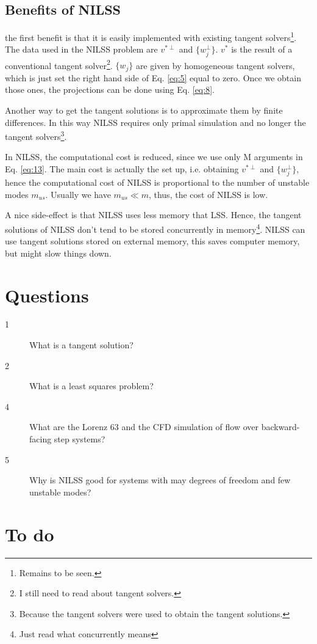 \documentclass[10pt,twoside,a4paper]{article} %
\begin{document}
\subsection{Benefits of NILSS}\label{3.5}
the first benefit is that it is easily implemented with existing tangent solvers\footnote{Remains to be seen.}. The data used in the NILSS problem are $v^{*\perp}$ and $\{ w_j^\perp \}$. $v^*$ is the result of a conventional tangent solver\footnote{I still need to read about tangent solvers.}. $\{ w_j \}$ are given by homogeneous tangent solvers, which is just set the right hand side of Eq. \ref{eq:5} equal to zero. Once we obtain those ones, the projections can be done using Eq. \ref{eq:8}.

Another way to get the tangent solutions is to approximate them by finite differences. In this way NILSS requires only primal simulation and no longer the tangent solvers\footnote{Because the tangent solvers were used to obtain the tangent solutions.}.

In NILSS, the computational cost is reduced, since we use only M arguments in Eq. \ref{eq:13}. The main cost is actually the set up, i.e. obtaining $v^{*\perp}$ and $\{ w_j^\perp \}$, hence the computational cost of NILSS is proportional to the number of unstable modes $m_{us}$. Usually we have $m_{us} \ll m$, thus, the cost of NILSS is low.

A nice side-effect is that NILSS uses less memory that LSS. Hence, the tangent solutions of NILSS don't tend to be stored concurrently in memory\footnote{Just read what concurrently means}. NILSS can use tangent solutions stored on external memory, this saves computer memory, but might slow things down.

\section{Questions}
\begin{description}
  \item [1] What is a tangent solution?
  \item [2] What is a least squares problem?
  \item [4] What are the Lorenz 63 and the CFD simulation of flow over backward-facing step systems?
  \item [5] Why is NILSS good for systems with may degrees of freedom and few unstable modes?
\end{description}
\newpage
\section{To do}
\end{document}
